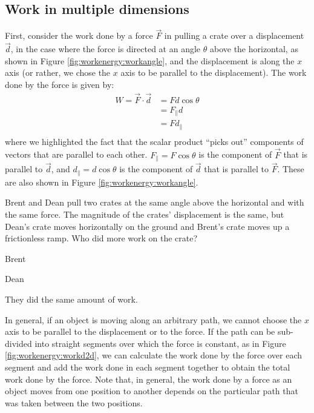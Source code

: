 \subsection{Work in multiple dimensions}
First, consider the work done by a force $\vec F$ in pulling a crate over a displacement $\vec d$, in the case where the force is directed at an angle $\theta$ above the horizontal, as shown in Figure \ref{fig:workenergy:workangle}, and the displacement is along the $x$ axis (or rather, we chose the $x$ axis to be parallel to the displacement).
The work done by the force is given by:
\begin{align*}
W = \vec F \cdot \vec d &= Fd\cos\theta\\
&= F_{\parallel}d\\
&= Fd_{\parallel}\\
\end{align*}
where we highlighted the fact that the scalar product ``picks out'' components of vectors that are parallel to each other. $F_{\parallel} = F\cos\theta$ is the component of $\vec F$ that is parallel to $\vec d$, and $d_{\parallel}=d\cos\theta$ is the component of $\vec d$ that is parallel to $\vec F$. These are also shown in Figure \ref{fig:workenergy:workangle}.

\begin{checkpoint}
\begin{MCquestion}{
Brent and Dean pull two crates at the same angle above the horizontal and with the same force. The magnitude of the crates' displacement is the same, but Dean's crate moves horizontally on the ground and Brent's crate moves up a frictionless ramp. Who did more work on the crate?}
\item Brent \correct
\item Dean 
\item They did the same amount of work.
\end{MCquestion}
\end{checkpoint}

In general, if an object is moving along an arbitrary path, we cannot choose the $x$ axis to be parallel to the displacement or to the force. If the path can be sub-divided into straight segments over which the force is constant, as in Figure \ref{fig:workenergy:workd2d}, we can calculate the work done by the force over each segment and add the work done in each segment together to obtain the total work done by the force. Note that, in general, the work done by a force as an object moves from one position to another depends on the particular path that was taken between the two positions.

